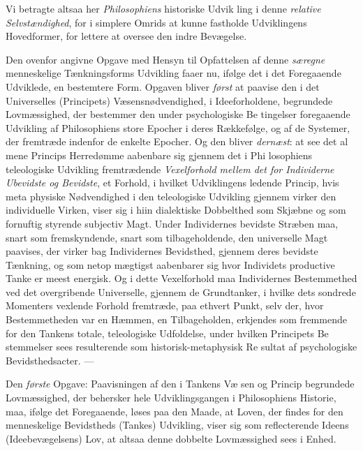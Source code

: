 Vi betragte altsaa her \emph{Philosophiens} historiske Udvik\-%
ling i denne \emph{relative Selvstændighed}, for i simplere
 Omrids at kunne fastholde Udviklingens Hovedformer, for lettere
at oversee den indre Bevægelse.

Den ovenfor angivne Opgave med Hensyn til Opfattelsen
af denne \emph{særegne} menneskelige Tænkningsforms Udvikling
faaer nu, ifølge det i det Foregaaende Udviklede, en bestemtere
Form. Opgaven bliver \emph{først} at paavise den i det Universelles
(Principets) Væsensnødvendighed, i Ideeforholdene, begrundede
Lovmæssighed, der bestemmer den under psychologiske Be\-%
tingelser foregaaende Udvikling af Philosophiens store Epocher
i deres Rækkefølge, og af de Systemer, der fremtræde indenfor
de enkelte Epocher. Og den bliver \emph{dernæst}: at see det al\-%
mene Princips Herredømme aabenbare sig gjennem det i Phi\-%
losophiens teleologiske Udvikling fremtrædende \emph{Vexelforhold
mellem det for Individerne Ubevidste og Bevidste},
et Forhold, i hvilket Udviklingens ledende Princip, hvis meta\-%
physiske Nødvendighed i den teleologiske Udvikling gjennem\-%
virker den individuelle Virken, viser sig i hiin dialektiske
Dobbelthed som Skjæbne og som fornuftig styrende subjectiv
Magt. Under Individernes bevidste Stræben maa, snart som
fremskyndende, snart som tilbageholdende, den universelle Magt
paavises, der virker bag Individernes Bevidsthed, gjennem deres
bevidste Tænkning, og som netop mægtigst aabenbarer sig
hvor Individets productive Tanke er meest energisk. Og i
dette Vexelforhold maa Individernes Bestemmethed ved det
overgribende Universelle, gjennem de Grundtanker, i hvilke
dets sondrede Momenters vexlende Forhold fremtræde, paa
ethvert Punkt, selv der, hvor Bestemmetheden var en Hæmmen,
en Tilbageholden, erkjendes som fremmende for den Tankens
totale, teleologiske Udfoldelse, under hvilken Principets Be\-%
stemmelser sees resulterende som historisk-metaphysisk Re\-%
sultat af psychologiske Bevidsthedsacter. ---

Den \emph{første} Opgave: Paavisningen af den i Tankens Væ\-%
sen og Princip begrundede Lovmæssighed, der behersker hele
Udviklingsgangen i Philosophiens Historie, maa, ifølge det
Foregaaende, løses paa den Maade, at Loven, der findes for
 den menneskelige Bevidstheds (Tankes) Udvikling, viser sig
som reflecterende Ideens (Ideebevægelsens) Lov, at altsaa denne
dobbelte Lovmæssighed sees i Enhed.

